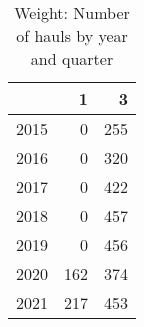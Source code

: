 \begin{table}[ht]
\centering
\begin{tabular}{rrr}
  \hline
 & 1 & 3 \\ 
  \hline
2015 & 0 & 255 \\ 
  2016 & 0 & 320 \\ 
  2017 & 0 & 422 \\ 
  2018 & 0 & 457 \\ 
  2019 & 0 & 456 \\ 
  2020 & 162 & 374 \\ 
  2021 & 217 & 453 \\ 
   \hline
\end{tabular}
\caption{Weight: Number of hauls by year and quarter} 
\end{table}
